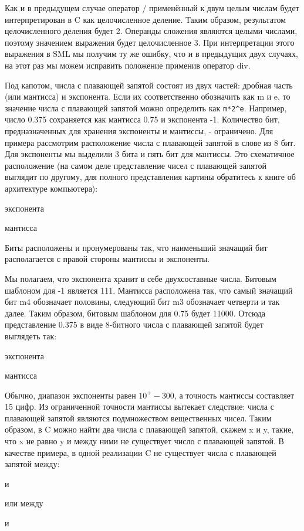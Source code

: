 Как и в предыдущем случае оператор / применённый к двум целым числам будет интерпретирован в C как целочисленное деление. Таким образом, результатом целочисленного деления будет 2. Операнды сложения являются целыми числами, поэтому значением выражения будет целочисленное 3. При интерпретации этого выражения в SML мы получим ту же ошибку, что и в предыдущих двух случаях, на этот раз мы можем исправить положение применив оператор div.

Под капотом, числа с плавающей запятой состоят из двух частей: дробная часть (или мантисса) и экспонента. Если их соответственно обозначить как m и e, то значение числа с плавающей запятой можно определить как \lstinline|m*2^e|. Например, число 0.375 сохраняется как мантисса 0.75 и экспонента -1. Количество бит, предназначенных для хранения экспоненты и мантиссы, - ограничено. Для примера рассмотрим расположение числа с плавающей запятой в слове из 8 бит. Для экспоненты мы выделили 3 бита и пять бит для мантиссы. Это схематичное расположение (на самом деле представление чисел с плавающей запятой выглядит по другому, для полного представления картины обратитесь к книге об архитектуре компьютера):

экспонента

мантисса

Биты расположены и пронумерованы так, что наименьший значащий бит располагается с правой стороны мантиссы и экспоненты.

Мы полагаем, что экспонента хранит в себе двухсоставные числа. Битовым шаблоном для -1 является 111. Мантисса расположена так, что самый значащий бит m4 обозначает половины, следующий бит m3 обозначает четверти и так далее. Таким образом, битовым шаблоном для 0.75 будет 11000. Отсюда представление 0.375 в виде 8-битного числа с плавающей запятой будет выглядеть так:

экспонента

мантисса

Обычно, диапазон экспоненты равен $10^+-300$, а точность мантиссы составляет 15 цифр. Из ограниченной точности мантиссы вытекает следствие: числа с плавающей запятой являются подмножеством вещественных чисел. Таким образом, в C можно найти два числа с плавающей запятой, скажем x и y, такие, что x не равно y и между ними не существует число с плавающей запятой. В качестве примера, в одной реализации C не существует числа с плавающей запятой между:

и

или между

и

